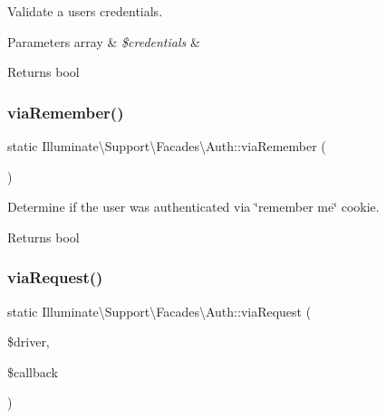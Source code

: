 Validate a user\textquotesingle{}s credentials.


\begin{DoxyParams}[1]{Parameters}
array & {\em \$credentials} & \\
\hline
\end{DoxyParams}
\begin{DoxyReturn}{Returns}
bool 
\end{DoxyReturn}
\mbox{\label{class_illuminate_1_1_support_1_1_facades_1_1_auth_a007b8696ba0250c38255e1bd3b23dbd5}} 
\subsubsection{\texorpdfstring{via\+Remember()}{viaRemember()}}
{\footnotesize\ttfamily static Illuminate\textbackslash{}\+Support\textbackslash{}\+Facades\textbackslash{}\+Auth\+::via\+Remember (\begin{DoxyParamCaption}{ }\end{DoxyParamCaption})\hspace{0.3cm}{\ttfamily [static]}}

Determine if the user was authenticated via \char`\"{}remember me\char`\"{} cookie.

\begin{DoxyReturn}{Returns}
bool 
\end{DoxyReturn}
\mbox{\label{class_illuminate_1_1_support_1_1_facades_1_1_auth_a6c74f6505618b87ab69949b662fba9b9}} 
\subsubsection{\texorpdfstring{via\+Request()}{viaRequest()}}
{\footnotesize\ttfamily static Illuminate\textbackslash{}\+Support\textbackslash{}\+Facades\textbackslash{}\+Auth\+::via\+Request (\begin{DoxyParamCaption}\item[{}]{\$driver,  }\item[{}]{\$callback }\end{DoxyParamCaption})\hspace{0.3cm}{\ttfamily [static]}}

